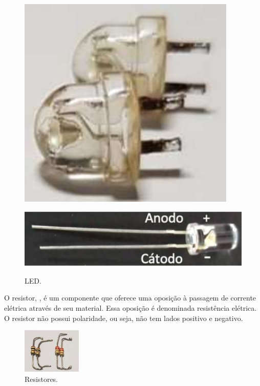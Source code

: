 \documentclass{textolivre-html}
\begin{document}
\begin{figure}[h!]
\begin{minipage}{0.27\textwidth}
\includegraphics[width=\linewidth]{figure-10.pdf}
\subcaption{}\label{fig05a}
\end{minipage}
\hfill
\begin{minipage}{0.47\textwidth} 
\includegraphics[width=\linewidth]{figure-11.pdf}
\subcaption{}\label{fig05b}
\end{minipage}
\caption{LED.}
\label{fig05}
\end{figure}

O resistor, , é um componente que oferece uma oposição à passagem de
corrente elétrica através de seu material. Essa oposição é denominada
resistência elétrica. O resistor não possui polaridade, ou seja, não tem lados
positivo e negativo.

\begin{figure}[htbp]
\centering
\includegraphics[width=0.25\textwidth]{figure-12.pdf}
\caption{Resistores.}
\label{fig06}
\end{figure}
\end{document}
